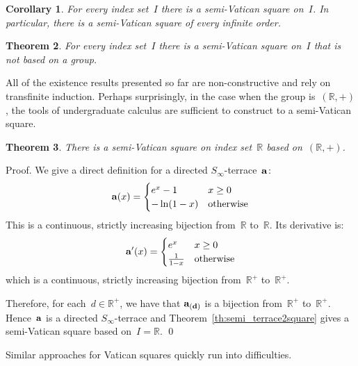 \documentclass[12pt,a4paper]{article}
\newtheorem{thm}{Theorem}[section]
\newtheorem{cor}[thm]{Corollary}
\newcommand{\R}{\mathbb{R}}
\begin{document}
\begin{cor}\label{cor:semi_vatsquares}
For every index set~$I$ there is a semi-Vatican square on~$I$.  In particular, there is a semi-Vatican square of every infinite order.
\end{cor}

\begin{thm}\label{th:semi_infvat}
For every index set~$I$ there is a semi-Vatican square on~$I$ that is not based on a  group.
\end{thm}

All of the existence results presented so far are non-constructive and rely on transfinite induction.  Perhaps surprisingly, in the case when the group is~$(\R, +)$, the tools of undergraduate calculus are sufficient to construct to a semi-Vatican square.


\begin{thm}\label{th:svr}
There is a semi-Vatican square on index set~$\R$ based on~$(\R,+)$.
\end{thm} 

\noindent
Proof.   We give a direct definition for a directed $S_{\infty}$-terrace~${\bf a}$:
\begin{equation*}
    {\bf a}(x) = \begin{cases}
               e^x   -1            & x \geq 0\\
               -\ln (1-x)       & \text{otherwise}
           \end{cases}
\end{equation*}
This is a continuous, strictly increasing bijection from~$\R$ to~$\R$.  Its derivative is:
\begin{equation*}
    {\bf a}'(x) = \begin{cases}
               e^x               & x \geq 0\\
              \frac{1}{1-x}       & \text{otherwise}
           \end{cases}
\end{equation*}
which is a continuous, strictly increasing bijection from~$\R^+$ to~$\R^+$.

Therefore, for each~$d \in \R^+$, we have that ${\bf a_{(d)}}$ is a bijection from~$\R^+$ to~$\R^+$.  Hence~${\bf a}$ is a directed $S_{\infty}$-terrace and Theorem~\ref{th:semi_terrace2square} gives a semi-Vatican square based on~$I = \R$.
\qed

Similar approaches for Vatican squares quickly run into difficulties.
\end{document}
